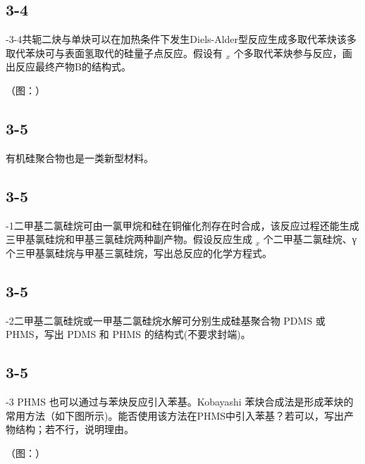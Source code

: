 \subsection*{3-4}
-3-4共轭二炔与单炔可以在加热条件下发生Diels-Alder型反应生成多取代苯炔该多取代苯炔可与表面氢取代的硅量子点反应。假设有 $_ { x }$ 个多取代苯炔参与反应，画出反应最终产物B的结构式。

（图：）

\subsection*{3-5}
有机硅聚合物也是一类新型材料。

\subsection*{3-5}
-1二甲基二氯硅烷可由一氯甲烷和硅在铜催化剂存在时合成，该反应过程还能生成三甲基氯硅烷和甲基三氯硅烷两种副产物。假设反应生成 $_ { x }$ 个二甲基二氯硅烷、γ个三甲基氯硅烷与甲基三氯硅烷，写出总反应的化学方程式。

\subsection*{3-5}
-2二甲基二氯硅烷或一甲基二氯硅烷水解可分别生成硅基聚合物 PDMS 或PHMS，写出 PDMS 和 PHMS 的结构式(不要求封端)。

\subsection*{3-5}
-3 PHMS 也可以通过与苯炔反应引入苯基。Kobayashi 苯炔合成法是形成苯炔的常用方法（如下图所示)。能否使用该方法在PHMS中引入苯基？若可以，写出产物结构；若不行，说明理由。

（图：）
